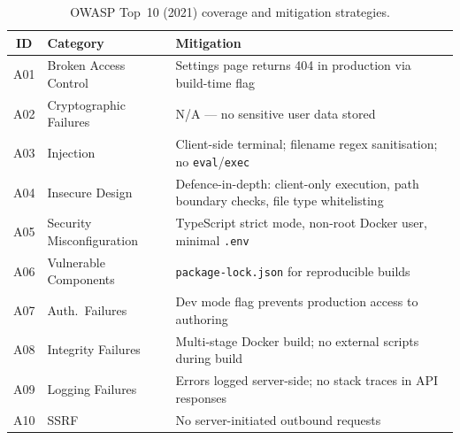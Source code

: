 \begin{table}[ht]
\centering
\caption{OWASP Top~10 (2021) coverage and mitigation strategies.}
\label{tab:owasp}
\small
\begin{tabularx}{\textwidth}{clX}
\toprule
\textbf{ID} & \textbf{Category} & \textbf{Mitigation} \\
\midrule
A01 & Broken Access Control & Settings page returns 404 in production via build-time flag \\
A02 & Cryptographic Failures & N/A --- no sensitive user data stored \\
A03 & Injection & Client-side terminal; filename regex sanitisation; no \texttt{eval}/\texttt{exec} \\
A04 & Insecure Design & Defence-in-depth: client-only execution, path boundary checks, file type whitelisting \\
A05 & Security Misconfiguration & TypeScript strict mode, non-root Docker user, minimal \texttt{.env} \\
A06 & Vulnerable Components & \texttt{package-lock.json} for reproducible builds \\
A07 & Auth.\ Failures & Dev mode flag prevents production access to authoring \\
A08 & Integrity Failures & Multi-stage Docker build; no external scripts during build \\
A09 & Logging Failures & Errors logged server-side; no stack traces in API responses \\
A10 & SSRF & No server-initiated outbound requests \\
\bottomrule
\end{tabularx}
\end{table}
